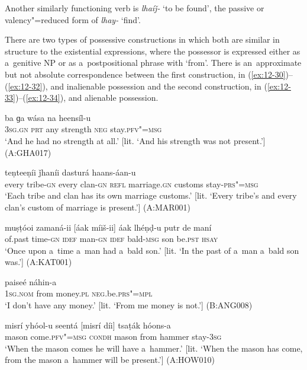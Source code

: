 Another similarly functioning verb is \textit{lhaíǰ-} `to be found', the passive or valency"=reduced form of \textit{lhay-} `find'.


 There are two types of possessive constructions in which both are similar in structure to the existential expressions, where the possessor is expressed either as a~genitive NP or as a~postpositional phrase with `from'. There is an~approximate but not absolute correspondence between the first construction, in (\ref{ex:12-30})--(\ref{ex:12-32}), and inalienable possession and the second construction, in (\ref{ex:12-33})--(\ref{ex:12-34}), and alienable possession.

\begin{exe}
\ex
\label{ex:12-30}
\gll [tasíi] ba ɡa wása na heensíl-u \\
\textsc{3sg.gn} \textsc{prt} any strength \textsc{neg} stay.\textsc{pfv"=msg} \\
\glt `And he had no strength at all.' [lit. `And his strength was not present.'] (A:GHA017)
\end{exe}
\begin{exe}
\ex
\label{ex:12-31}
 teṇteeṇíi ǰhaníi dasturá haans-áan-u \\
every tribe-\textsc{gn} every clan-\textsc{gn} \textsc{refl} marriage.\textsc{gn}  customs stay-\textsc{prs"=msg}\\
\glt `Each tribe and clan has its own marriage customs.' [lit. `Every tribe's and every clan's custom of marriage is present.'] (A:MAR001)

\ex
\label{ex:12-32}
\gll muṣṭóoi zamaná-ii [áak míiš-ii] áak lhéṇḍ-u putr de maní \\
of.past time-\textsc{gn} \textsc{idef} man-\textsc{gn} \textsc{idef} bald-\textsc{msg} son be.\textsc{pst} \textsc{hsay} \\
\glt `Once upon a~time a~man had a~bald son.' [lit. `In the past of a~man a~bald son was.'] (A:KAT001)
\end{exe}
\begin{exe}
\ex
\label{ex:12-33}
\gll [ma díi] paiseé náhin-a \\
\textsc{1sg.nom} from money.\textsc{pl} \textsc{neg}.be.\textsc{prs"=mpl} \\
\glt `I don't have any money.' [lit. `From me money is not.'] (B:ANG008)
\end{exe}
\begin{exe}
\ex
\label{ex:12-34}
\gll misrí yhóol-u seentá [misrí díi] tsaṭák hóons-a \\
mason come.\textsc{pfv"=msg} \textsc{condh} mason from hammer stay-\textsc{3sg} \\
\glt `When the mason comes he will have a~hammer.' [lit. `When the mason has come, from the mason a~hammer will be present.'] (A:HOW010)
\end{exe}

